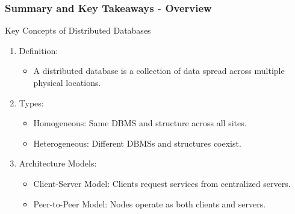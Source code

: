 \documentclass[aspectratio=169]{beamer}
\begin{document}
\begin{frame}[fragile]
    \frametitle{Summary and Key Takeaways - Overview}
    \begin{block}{Key Concepts of Distributed Databases}
        \begin{enumerate}
            \item Definition:
                \begin{itemize}
                    \item A distributed database is a collection of data spread across multiple physical locations.
                \end{itemize}
            \item Types:
                \begin{itemize}
                    \item Homogeneous: Same DBMS and structure across all sites.
                    \item Heterogeneous: Different DBMSs and structures coexist.
                \end{itemize}
            \item Architecture Models:
                \begin{itemize}
                    \item Client-Server Model: Clients request services from centralized servers.
                    \item Peer-to-Peer Model: Nodes operate as both clients and servers.
                \end{itemize}
        \end{enumerate}
    \end{block}
\end{frame}
\end{document}
